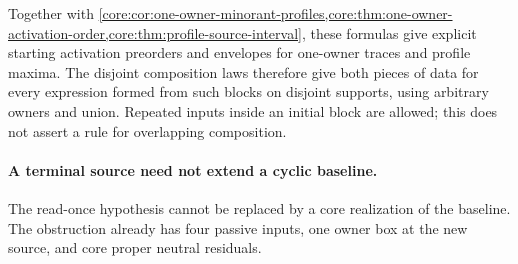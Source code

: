 Together with \cref{core:cor:one-owner-minorant-profiles,core:thm:one-owner-activation-order,core:thm:profile-source-interval},
these formulas give explicit starting activation preorders and envelopes
for one-owner traces and profile maxima. The disjoint composition laws
therefore give both pieces of data for every expression formed from
such blocks on disjoint supports, using arbitrary owners and union.
Repeated inputs inside an initial block are allowed; this does not
assert a rule for overlapping composition.

\paragraph{A terminal source need not extend a cyclic baseline.}
The read-once hypothesis cannot be replaced by a core realization of the
baseline. The obstruction already has four passive inputs, one owner box
at the new source, and core proper neutral residuals.

